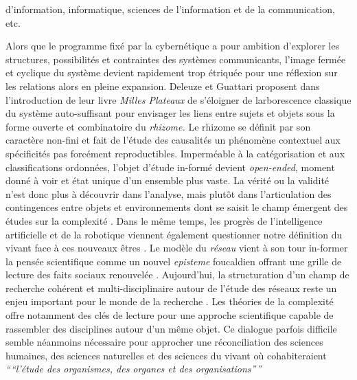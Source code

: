 d{\textquoteright}information, informatique, sciences de l{\textquoteright}information et de la communication, etc.  


Alors que le programme fixé par la cybernétique a pour ambition  d{\textquoteright}explorer les structures, possibilités et  contraintes des systèmes communicants, l{\textquoteright}image  fermée et cyclique du système devient rapidement trop étriquée pour une réflexion sur les relations alors en pleine expansion. Deleuze et  Guattari proposent dans l{\textquoteright}introduction de leur livre  \textit{Milles Plateaux} \citep{Deleuze1972} de s{\textquoteright}éloigner de  l{\textquotesingle}arborescence classique du système auto-suffisant  pour envisager les liens entre sujets et objets sous la forme ouverte  et combinatoire du \textit{rhizome. }Le rhizome se définit par son  caractère non-fini et fait de l{\textquoteright}étude des  causalités un phénomène contextuel aux spécificités pas  forcément reproductibles. Imperméable à la catégorisation et  aux classifications ordonnées, l{\textquoteright}objet  d{\textquoteright}étude in-formé devient \textit{open-ended},  moment donné à voir et état unique d{\textquoteright}un ensemble  plus vaste. La vérité ou la validité n{\textquoteright}est donc  plus à découvrir dans l{\textquoteright}analyse, mais plut\^ot dans  l{\textquoteright}articulation des contingences entre objets et  environnements dont se saisit le champ émergent des études sur la  complexité \citep{Morin1990}. Dans le m\^eme temps, les progrès de  l{\textquoteright}intelligence artificielle et de la robotique viennent  également questionner notre définition du vivant face à ces  nouveaux \^etres \citep{Hofstadter1999}. Le modèle du \textit{réseau  }vient à son tour in-former la pensée scientifique comme un nouvel  \textit{episteme }foucaldien offrant une grille de lecture des faits  sociaux renouvelée \citep{Castells1989, Latour1996}.  Aujourd{\textquoteright}hui, la structuration d{\textquoteright}un  champ de recherche cohérent et multi-disciplinaire autour de  l{\textquoteright}étude des réseaux reste un enjeu important pour  le monde de la recherche \citep{Brandes2013}. Les théories de la complexité offre notamment des clés de lecture pour une approche scientifique capable de rassembler des disciplines autour d'un même objet. Ce dialogue parfois difficile semble néanmoins nécessaire pour approcher une réconciliation des sciences humaines, des sciences naturelles et des sciences du vivant o\`u cohabiteraient \textit{``{\textquotedblleft}l{\textquoteright}étude des organismes, des organes et des organisations{\textquotedblright}''} \citep{Morin1990}


